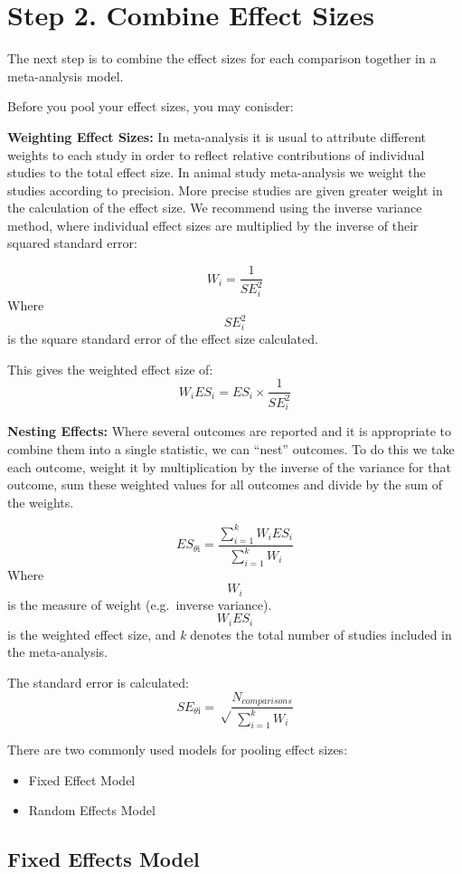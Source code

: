 \documentclass[
]{book}
\begin{document}
\hypertarget{step-2.-combine-effect-sizes}{%
\section{Step 2. Combine Effect Sizes}\label{step-2.-combine-effect-sizes}}

The next step is to combine the effect sizes for each comparison together in a meta-analysis model.

Before you pool your effect sizes, you may conisder:

\textbf{Weighting Effect Sizes:}
In meta-analysis it is usual to attribute different weights to each study in order to reflect relative contributions of individual studies to the total effect size. In animal study meta-analysis we weight the studies according to precision. More precise studies are given greater weight in the calculation of the effect size. We recommend using the inverse variance method, where individual effect sizes are multiplied by the inverse of their squared standard error:

\[W_i = \frac{1}{SE^2_i} \]
Where \[{SE^2_i}\] is the square standard error of the effect size calculated.

This gives the weighted effect size of:
\[W_iES_i = ES_i \times \frac{1}{SE^2_i} \]

\textbf{Nesting Effects:}
Where several outcomes are reported and it is appropriate to combine them into a single statistic, we can ``nest'' outcomes. To do this we take each outcome, weight it by multiplication by the inverse of the variance for that outcome, sum these weighted values for all outcomes and divide by the sum of the weights.

\[ES_{\theta\text{i}} = \frac{\sum_{i=1}^{k} W_iES_i}{\sum_{i=1}^{k} W_i} \]
Where \[W_i\] is the measure of weight (e.g.~inverse variance). \[W_iES_i \] is the weighted effect size, and \emph{k} denotes the total number of studies included in the meta-analysis.

The standard error is calculated:
\[SE_{\theta\text{i}} = \sqrt \frac{N_{comparisons}}{\sum_{i=1}^{k} W_i} \]

There are two commonly used models for pooling effect sizes:

\begin{itemize}
\item
  Fixed Effect Model
\item
  Random Effects Model
\end{itemize}

\hypertarget{fixed-effects-model}{%
\subsection{Fixed Effects Model}\label{fixed-effects-model}}
\end{document}
